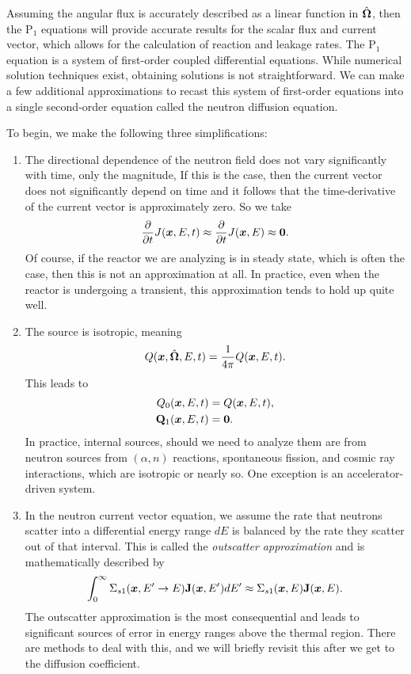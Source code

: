 Assuming the angular flux is accurately described as a linear function in $\hat{\mathbf{\Omega}}$, then the P$_1$ equations will provide accurate results for the scalar flux and current vector, which allows for the calculation of reaction and leakage rates. The P$_1$ equation is a system of first-order coupled differential equations. While numerical solution techniques exist, obtaining solutions is not straightforward. We can make a few additional approximations to recast this system of first-order equations into a single second-order equation called the neutron diffusion equation.

To begin, we make the following three simplifications:
\begin{enumerate}
  \item The directional dependence of the neutron field does not vary significantly with time, only the magnitude, If this is the case, then the current vector does not significantly depend on time and it follows that the time-derivative of the current vector is approximately zero. So we take
  \begin{align}
    \frac{ \partial {} }{ \partial {t} } J(\bm{x},E,t) \approx \frac{ \partial {} }{ \partial {t} } J(\bm{x},E) \approx \mathbf{0}.
  \end{align}
  Of course, if the reactor we are analyzing is in steady state, which is often the case, then this is not an approximation at all. In practice, even when the reactor is undergoing a transient, this approximation tends to hold up quite well.
  \item The source is isotropic, meaning
  \begin{align}
    Q(\bm{x},\hat{\mathbf{\Omega}},E,t) = \frac{1}{4\pi} Q(\bm{x},E,t) .
  \end{align}
  This leads to
  \begin{subequations}
  \begin{align}
    Q_0(\bm{x},E,t) &= Q(\bm{x},E,t), \\
    \mathbf{Q}_1(\bm{x},E,t) &= \mathbf{0} .
  \end{align}
  \end{subequations}
  In practice, internal sources, should we need to analyze them are from neutron sources from $(\alpha,n)$ reactions, spontaneous fission, and cosmic ray interactions, which are isotropic or nearly so. One exception is an accelerator-driven system.
  \item In the neutron current vector equation, we assume the rate that neutrons scatter into a differential energy range $dE$ is balanced by the rate they scatter out of that interval. This is called the \emph{outscatter approximation} and is mathematically described by
  \begin{align}
    \int_0^\infty \Sigma_{s1}(\bm{x}, E' \rightarrow E ) \mathbf{J}(\bm{x},E') dE' \approx \Sigma_{s1}(\bm{x},E) \mathbf{J}(\bm{x},E) .
  \end{align}
  The outscatter approximation is the most consequential and leads to significant sources of error in energy ranges above the thermal region. There are methods to deal with this, and we will briefly revisit this after we get to the diffusion coefficient.
\end{enumerate}

